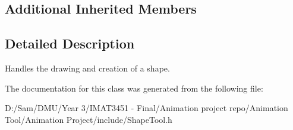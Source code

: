 \subsection*{Additional Inherited Members}


\subsection{Detailed Description}
Handles the drawing and creation of a shape. 

The documentation for this class was generated from the following file\+:\begin{DoxyCompactItemize}
\item 
D\+:/\+Sam/\+D\+M\+U/\+Year 3/\+I\+M\+A\+T3451 -\/ Final/\+Animation project repo/\+Animation Tool/\+Animation Project/include/Shape\+Tool.\+h\end{DoxyCompactItemize}
